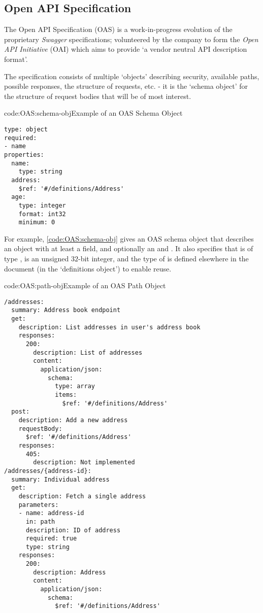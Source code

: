 \subsection{Open API Specification} \label{bg:OAS}

The Open API Specification (OAS) is a work-in-progress evolution of the proprietary \emph{Swagger} specifications; volunteered by the company to form the \emph{Open API Initiative} (OAI) which aims to provide `a vendor neutral API description format'. \cite{about_oai}

The specification consists of multiple `objects' describing security, available paths, possible responses, the structure of requests, etc. - it is the `schema object' for the structure of request bodies that will be of most interest.

\begin{codelisting}{code:OAS:schema-obj}{Example of an OAS Schema Object}
\begin{verbatim}
type: object
required:
- name
properties:
  name:
    type: string
  address:
    $ref: '#/definitions/Address'
  age:
    type: integer
    format: int32
    minimum: 0
\end{verbatim}
\end{codelisting}

For example, \cref{code:OAS:schema-obj} gives an OAS schema object that describes an object with at least a  field, and optionally an  and . It also specifies that  is of type ,  is an unsigned $32$-bit integer, and the type of  is defined elsewhere in the document (in the `definitions object') to enable reuse.

\begin{codelisting}{code:OAS:path-obj}{Example of an OAS Path Object}
\begin{verbatim}
/addresses:
  summary: Address book endpoint
  get:
    description: List addresses in user's address book
    responses:
      200:
        description: List of addresses
        content:
          application/json:
            schema:
              type: array
              items:
                $ref: '#/definitions/Address' 
  post:
    description: Add a new address
    requestBody:
      $ref: '#/definitions/Address'
    responses:
      405:
        description: Not implemented
/addresses/{address-id}:
  summary: Individual address
  get:
    description: Fetch a single address
    parameters:
    - name: address-id
      in: path
      description: ID of address
      required: true
      type: string
    responses:
      200:
        description: Address
        content:
          application/json:
            schema:
              $ref: '#/definitions/Address'
\end{verbatim}
\end{codelisting}

